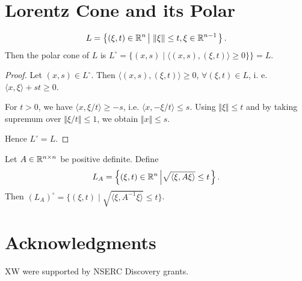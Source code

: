 \documentclass[12pt]{article}
\begin{document}
\section{Lorentz Cone and its Polar}
    \begin{example}
        \begin{equation}
            L = \left\lbrace
            (\xi, t) \in \mathbb R^n \left| \;
                \Vert \xi\Vert \le t, \xi \in \mathbb R^{n - 1}
            \right.
            \right\rbrace.
        \end{equation}
        Then the polar cone of $L$ is $L^\circ = \{(x, s) \;|\; \langle (x, s), (\xi, t)\rangle \ge 0\}\} = L$.
    \end{example}
    \begin{proof}
        \par
        Let $(x, s) \in L^\circ$. Then $\langle (x, s), (\xi, t)\rangle \ge 0$, $\forall (\xi, t) \in L$, i. e. $\langle x, \xi\rangle + st \ge 0$.
        \par
        For $t > 0$, we have $\langle x, \xi/t\rangle \ge -s$, i.e. $\langle x, - \xi/t\rangle \le s$. Using $\Vert \xi\Vert \le t$ and by taking supremum over $\Vert \xi/t\Vert\le 1$, we obtain  $\Vert x\Vert \le s$.
        \par
        Hence $L^\circ = L$.
    \end{proof}
    \begin{corollary}
        Let $A \in \mathbb R^{n\times n}$ be positive definite. Define
        $$
            L_A =
            \left\lbrace
                (\xi, t)\in \mathbb R^n \left|
                    \sqrt{\langle \xi, A\xi\rangle} \le t
                \right.
            \right\rbrace.
        $$
        Then $(L_A)^\circ = \{ (\xi, t) \;|\; \sqrt{\langle \xi, A^{-1}\xi\rangle}\le t\}$.
    \end{corollary}


\section*{Acknowledgments}
    XW were supported by NSERC Discovery grants.
\end{document}
